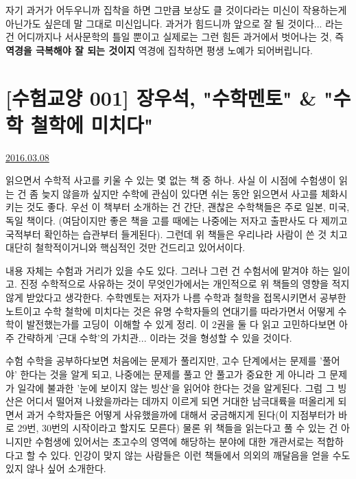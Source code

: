 자기 과거가 어두우니까 집착을 하면 그만큼 보상도 클 것이다라는 미신이 작용하는게 아닌가도 싶은데 말 그대로 미신입니다.
과거가 힘드니까 앞으로 잘 될 것이다... 라는 건 어디까지나 서사문학의 틀일 뿐이고
실제로는 그런 힘든 과거에서 벗어나는 것, 즉 \textbf{역경을 극복해야 잘 되는 것이지} 역경에 집착하면 평생 노예가 되어버립니다.
\vspace{5mm}









\section{[수험교양 001] 장우석, "수학멘토" & "수학 철학에 미치다"}
\href{https://www.kockoc.com/Apoc/668096}{2016.03.08}

\vspace{5mm}

읽으면서 수학적 사고를 키울 수 있는 몇 없는 책 중 하나.
사실 이 시점에 수험생이 읽는 건 좀 늦지 않을까 싶지만 수학에 관심이 있다면 쉬는 동안 읽으면서 사고를 체화시키는 것도 좋다.
우선 이 책부터 소개하는 건 간단, 괜찮은 수학책들은 주로 일본, 미국, 독일 책이다.
(여담이지만 좋은 책을 고를 때에는 나중에는 저자고 출판사도 다 제끼고 국적부터 확인하는 습관부터 들게된다).
그런데 위 책들은 우리나라 사람이 쓴 것 치고 대단히 철학적이거니와 핵심적인 것만 건드리고 있어서이다.
\vspace{5mm}

내용 자체는 수험과 거리가 있을 수도 있다. 그러나 그런 건 수험서에 맡겨야 하는 일이고.
진정 수학적으로 사유하는 것이 무엇인가에서는 개인적으로 위 책들의 영향을 적지 않게 받았다고 생각한다.
수학멘토는 저자가 나름 수학과 철학을 접목시키면서 공부한 노트이고
수학 철학에 미치다는 것은 유명 수학자들의 연대기를 따라가면서 어떻게 수학이 발전했는가를 고딩이 이해할 수 있게 정리.
이 2권을 둘 다 읽고 고민하다보면 아주 간략하게 '근대 수학'의 가치관... 이라는 것을 형성할 수 있을 것이다.
\vspace{5mm}

수험 수학을 공부하다보면 처음에는 문제가 풀리지만, 고수 단계에서는 문제를 '풀어야' 한다는 것을 알게 되고,
나중에는 문제를 풀고 안 풀고가 중요한 게 아니라 그 문제가 일각에 불과한 '눈에 보이지 않는 빙산'을 읽어야 한다는 것을 알게된다.
그럼 그 빙산은 어디서 떨어져 나왔을까라는 데까지 이르게 되면 거대한 남극대륙을 떠올리게 되면서
과거 수학자들은 어떻게 사유했을까에 대해서 궁금해지게 된다(이 지점부터가 바로 29번, 30번의 시작이라고 할지도 모른다)
물론 위 책들을 읽는다고 풀 수 있는 건 아니지만 수험생에 있어서는 초고수의 영역에 해당하는 분야에 대한 개관서로는 적합하다고 할 수 있다.
인강이 맞지 않는 사람들은 이런 책들에서 의외의 깨달음을 얻을 수도 있지 않나 싶어 소개한다.
\vspace{5mm}







